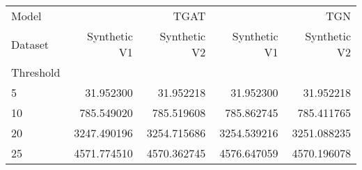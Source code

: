 \begin{tabular}{lrrrr}
\toprule
Model & \multicolumn{2}{r}{TGAT} & \multicolumn{2}{r}{TGN} \\
Dataset & Synthetic V1 & Synthetic V2 & Synthetic V1 & Synthetic V2 \\
Threshold &  &  &  &  \\
\midrule
5 & 31.952300 & 31.952218 & 31.952300 & 31.952218 \\
10 & 785.549020 & 785.519608 & 785.862745 & 785.411765 \\
20 & 3247.490196 & 3254.715686 & 3254.539216 & 3251.088235 \\
25 & 4571.774510 & 4570.362745 & 4576.647059 & 4570.196078 \\
\bottomrule
\end{tabular}
